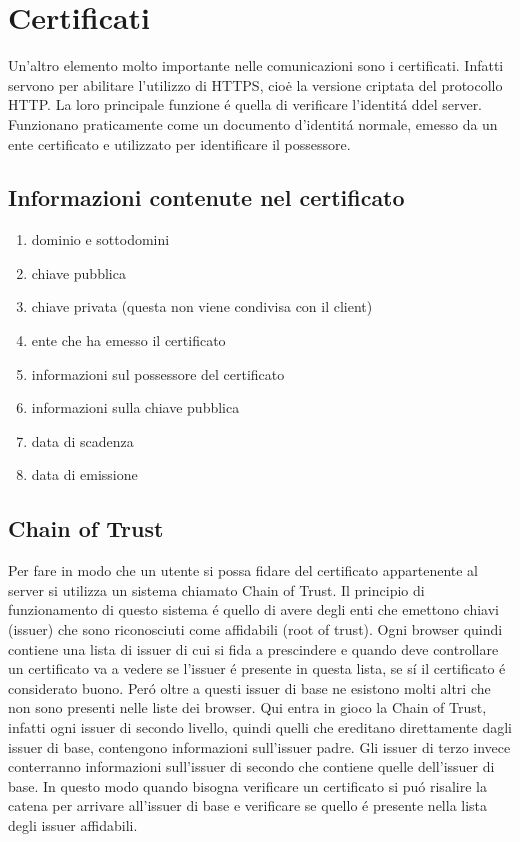 \section{Certificati}
\cite{certificates}
Un'altro elemento molto importante nelle comunicazioni sono i certificati. Infatti servono per abilitare l'utilizzo di HTTPS, cioė la versione criptata del protocollo HTTP. La loro principale funzione é quella di verificare l'identitá ddel server. Funzionano praticamente come un documento d'identitá normale, emesso da un ente certificato e utilizzato per identificare il possessore.
\subsection{Informazioni contenute nel certificato}
\begin{enumerate}
  \item dominio e sottodomini
  \item chiave pubblica
  \item chiave privata (questa non viene condivisa con il client)
  \item ente che ha emesso il certificato
  \item informazioni sul possessore del certificato
  \item informazioni sulla chiave pubblica
  \item data di scadenza
  \item data di emissione

\end{enumerate}
\subsection{Chain of Trust}
Per fare in modo che un utente si possa fidare del certificato appartenente al server si utilizza un sistema chiamato Chain of Trust. Il principio di funzionamento di questo sistema é quello di avere degli enti che emettono chiavi (issuer) che sono riconosciuti come affidabili (root of trust). Ogni browser quindi contiene una lista di issuer di cui si fida a prescindere e quando deve controllare un certificato va a vedere se l'issuer é presente in questa lista, se sí il certificato é considerato buono. Peró oltre a questi issuer di base ne esistono molti altri che non sono presenti nelle liste dei browser. Qui entra in gioco la Chain of Trust, infatti ogni issuer di secondo livello, quindi quelli che ereditano direttamente dagli issuer di base, contengono informazioni sull'issuer padre. Gli issuer di terzo invece conterranno informazioni sull'issuer di secondo che contiene quelle dell'issuer di base. In questo modo quando bisogna verificare un certificato si puó risalire la catena per arrivare all'issuer di base e verificare se quello é presente nella lista degli issuer affidabili.

